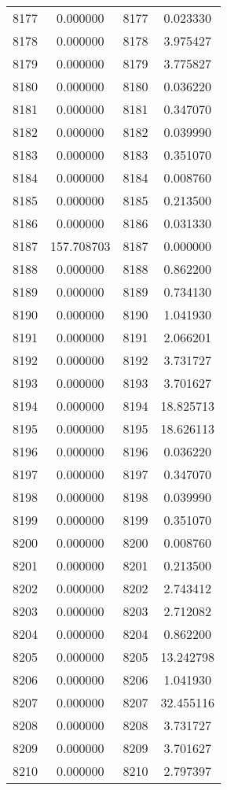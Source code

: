 \documentclass[12pt]{article}
\begin{document}
\begin{longtable}{@{}cccc@{}}
8177 & 0.000000 & 8177 & 0.023330 \\
8178 & 0.000000 & 8178 & 3.975427 \\
8179 & 0.000000 & 8179 & 3.775827 \\
8180 & 0.000000 & 8180 & 0.036220 \\
8181 & 0.000000 & 8181 & 0.347070 \\
8182 & 0.000000 & 8182 & 0.039990 \\
8183 & 0.000000 & 8183 & 0.351070 \\
8184 & 0.000000 & 8184 & 0.008760 \\
8185 & 0.000000 & 8185 & 0.213500 \\
8186 & 0.000000 & 8186 & 0.031330 \\
8187 & 157.708703 & 8187 & 0.000000 \\
8188 & 0.000000 & 8188 & 0.862200 \\
8189 & 0.000000 & 8189 & 0.734130 \\
8190 & 0.000000 & 8190 & 1.041930 \\
8191 & 0.000000 & 8191 & 2.066201 \\
8192 & 0.000000 & 8192 & 3.731727 \\
8193 & 0.000000 & 8193 & 3.701627 \\
8194 & 0.000000 & 8194 & 18.825713 \\
8195 & 0.000000 & 8195 & 18.626113 \\
8196 & 0.000000 & 8196 & 0.036220 \\
8197 & 0.000000 & 8197 & 0.347070 \\
8198 & 0.000000 & 8198 & 0.039990 \\
8199 & 0.000000 & 8199 & 0.351070 \\
8200 & 0.000000 & 8200 & 0.008760 \\
8201 & 0.000000 & 8201 & 0.213500 \\
8202 & 0.000000 & 8202 & 2.743412 \\
8203 & 0.000000 & 8203 & 2.712082 \\
8204 & 0.000000 & 8204 & 0.862200 \\
8205 & 0.000000 & 8205 & 13.242798 \\
8206 & 0.000000 & 8206 & 1.041930 \\
8207 & 0.000000 & 8207 & 32.455116 \\
8208 & 0.000000 & 8208 & 3.731727 \\
8209 & 0.000000 & 8209 & 3.701627 \\
8210 & 0.000000 & 8210 & 2.797397 \\

\end{longtable}
\end{document}
